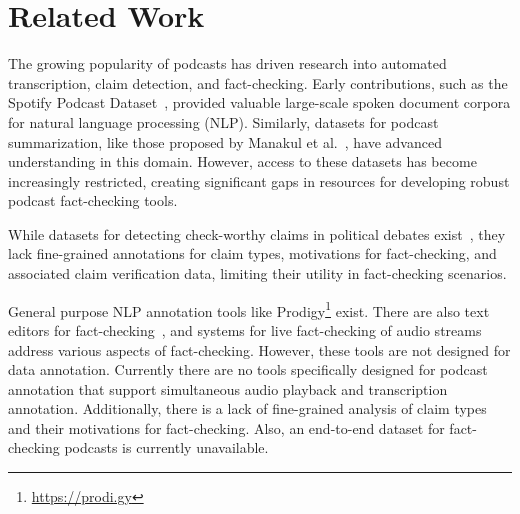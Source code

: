 \section{Related Work}
The growing popularity of podcasts has driven research into automated transcription, claim detection, and fact-checking. Early contributions, such as the Spotify Podcast Dataset~\cite{clifton2020100}, provided valuable large-scale spoken document corpora for natural language processing (NLP). Similarly, datasets for podcast summarization, like those proposed by Manakul et al.~\cite{manakul2022podcast}, have advanced understanding in this domain. However, access to these datasets has become increasingly restricted, creating significant gaps in resources for developing robust podcast fact-checking tools.

While datasets for detecting check-worthy claims in political debates exist~\cite{ivanov2024detecting,hassan2017claimbuster}, they lack fine-grained annotations for claim types, motivations for fact-checking, and associated claim verification data, limiting their utility in fact-checking scenarios.

General purpose NLP annotation tools like Prodigy\footnote{\url{https://prodi.gy}} exist. There are also text editors for fact-checking~\cite{setty2024factcheck}, and systems for live fact-checking of audio streams~\cite{setty2024livefc} address various aspects of fact-checking. However, these tools are not designed for data annotation. Currently there are no tools specifically designed for podcast annotation that support simultaneous audio playback and transcription annotation. Additionally, there is a lack of fine-grained analysis of claim types and their motivations for fact-checking. Also, an end-to-end dataset for fact-checking podcasts is currently unavailable.
